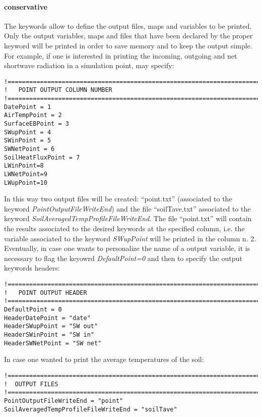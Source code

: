 \paragraph{conservative} The keywords allow to define the output files, maps and variables to be printed.\\
Only the output variables, maps and files that have been declared by the proper keyword will be printed in order to save memory and to keep the output simple.\\
For example, if one is interested in printing the incoming, outgoing and net shortwave radiation in a simulation point, may specify:

\footnotesize{
\begin{verbatim}
!=============================================================================
!   POINT OUTPUT COLUMN NUMBER
!=============================================================================
DatePoint = 1
AirTempPoint = 2
SurfaceEBPoint = 3
SWupPoint = 4
SWinPoint = 5
SWNetPoint = 6
SoilHeatFluxPoint = 7
LWinPoint=8
LWNetPoint=9
LWupPoint=10
\end{verbatim}
}

\noindent In this way two output files will be created: ``point.txt'' (associated to the keyword {\it PointOutputFileWriteEnd}) and the file ``soilTave.txt'' associated to the keyword {\it SoilAveragedTempProfileFileWriteEnd}. The file ``point.txt'' will contain the results associated to the desired keywords at the specified column, i.e. the variable associated to the keyword {\it SWupPoint} will be printed in the column n. 2. Eventually, in case one wants to personalize the name of a output variable, it is necessary to flag the keyowrd {\it DefaultPoint=0} and then to specify the output keywords headers:

\footnotesize{
\begin{verbatim}
!=============================================================================
!   POINT OUTPUT HEADER
!=============================================================================
DefaultPoint = 0
HeaderDatePoint = "date"
HeaderSWupPoint = "SW out"
HeaderSWinPoint = "SW in"
HeaderSWNetPoint = "SW net"
\end{verbatim}
}


\noindent In case one wanted to print the average temperatures of the soil:

\footnotesize{
\begin{verbatim}
!=============================================================================
!  OUTPUT FILES
!=============================================================================
PointOutputFileWriteEnd = "point"
SoilAveragedTempProfileFileWriteEnd = "soilTave"
\end{verbatim}
}


